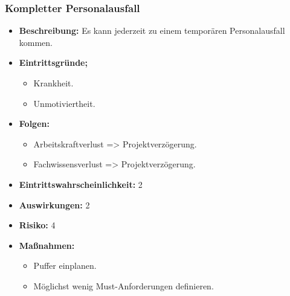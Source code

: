 \subsubsection{Kompletter Personalausfall}
\begin{itemize}
	\item \textbf{Beschreibung:} \newline
	Es kann jederzeit zu einem temporären Personalausfall kommen.
	\item \textbf{Eintrittsgründe;}
	\begin{itemize}
		\item Krankheit.
		\item Unmotiviertheit.
	\end{itemize}
	\item \textbf{Folgen:}
	\begin{itemize}
		\item Arbeitskraftverlust => Projektverzögerung.
		\item Fachwissensverlust => Projektverzögerung.
	\end{itemize}
	\item \textbf{Eintrittswahrscheinlichkeit:} 2
	\item \textbf{Auswirkungen:} 2
	\item \textbf{Risiko:} 4
	\item \textbf{Maßnahmen:}
	\begin{itemize}
		\item Puffer einplanen.
		\item Möglichst wenig Must-Anforderungen definieren.
	\end{itemize}
\end{itemize}